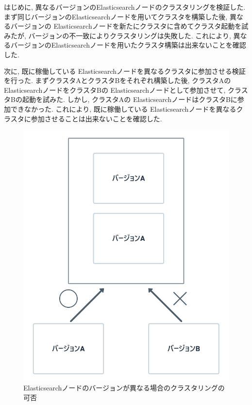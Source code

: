 はじめに, 異なるバージョンのElasticsearchノードのクラスタリングを検証した. まず同じバージョンのElasticsearchノードを用いてクラスタを構築した後, 異なるバージョンの Elasticsearchノードを新たにクラスタに含めてクラスタ起動を試みたが, バージョンの不一致によりクラスタリングは失敗した. これにより, 異なるバージョンのElasticsearchノードを用いたクラスタ構築は出来ないことを確認した.

次に, 既に稼働している Elasticsearchノードを異なるクラスタに参加させる検証を行った. まずクラスタAとクラスタBをそれぞれ構築した後, クラスタAの ElasticsearchノードをクラスタBの Elasticsearchノードとして参加させて, クラスタBの起動を試みた. しかし, クラスタAの ElasticsearchノードはクラスタBに参加できなかった. これにより, 既に稼働している Elasticsearchノードを異なるクラスタに参加させることは出来ないことを確認した.

\begin{figure}[H]
  \begin{center}
    \includegraphics[width=140mm]{sotu/figure/youshi-3.png}
    \caption{Elasticsearchノードのバージョンが異なる場合のクラスタリングの可否}
    \label{4-p16}
  \end{center}
\end{figure}

